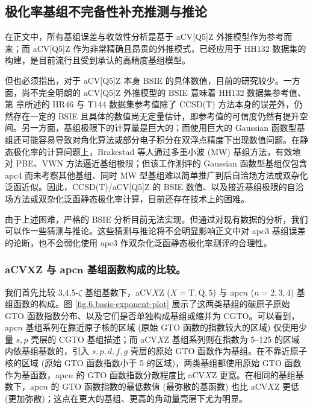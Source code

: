 \subsection{极化率基组不完备性补充推测与推论}
\label{sec.6.supp-bsie}

在正文中，所有基组误差与收敛性分析是基于 aCV[Q5]Z 外推模型作为参考而来；而 aCV[Q5]Z 作为非常精确且昂贵的外推模式，已经应用于 HH132 数据集的构建\cite{Hait-Head-Gordon.PCCP.2018}，是目前流行且受到承认的高精度基组模型。

但也必须指出，对于 aCV[Q5]Z 本身 BSIE 的具体数值，目前的研究较少。一方面，尚不完全明朗的 aCV[Q5]Z 外推模型的 BSIE 意味着 HH132 数据集参考值\cite{Hait-Head-Gordon.PCCP.2018}、第  章所述的 HR46 与 T144 数据集参考值除了 CCSD(T) 方法本身的误差外，仍然存在一定的 BSIE 且具体的数值尚无定量估计，即参考值的可信度仍然有提升空间。另一方面，基组极限下的计算量是巨大的；而使用巨大的 Gaussian 函数型基组还可能容易导致对角化算法或部分电子积分在双浮点精度下出现数值问题。在静态极化率的计算问题上，Brakestad 等人\cite{Brakestad-Frediani.JCTC.2020}通过多重小波 (MW) 基组方法，有效地对 PBE、VWN 方法逼近基组极限；但该工作测评的 Gaussian 函数型基组仅包含 apc4 而未考察其他基组、同时 MW 型基组难以简单推广到后自洽场方法或双杂化泛函近似。因此，CCSD(T)/aCV[Q5]Z 的 BSIE 数值、以及接近基组极限的自洽场方法或双杂化泛函静态极化率计算，目前还存在技术上的困难。

由于上述困难，严格的 BSIE 分析目前无法实现。但通过对现有数据的分析，我们可以作一些猜测与推论。这些猜测与推论将不会明显影响正文中对 apc3 基组误差的论断，也不会弱化使用 apc3 作双杂化泛函静态极化率测评的合理性。

\subsubsection{aCV$\bm{X}$Z 与 apc$\bm{n}$ 基组函数构成的比较。}

我们首先比较 3,4,5-$\zeta$ 基组基数下，aCV$X$Z ($X=\mathrm{T,Q,5}$) 与 apc$n$ ($n=2,3,4$) 基组函数的构成。图 \ref{fig.6.basis-exponent-plot} 展示了这两类基组的碳原子原始 GTO 函数指数分布、以及它们是否单独构成基组或缩并为 CGTO。可以看到，apc$n$ 基组系列在靠近原子核的区域 (原始 GTO 函数的指数较大的区域) 仅使用少量 $s, p$ 壳层的 CGTO 基组描述；而 aCV$X$Z 基组系列则在指数为 5--125 的区域内依基组基数的，引入 $s, p, d, f, g$ 壳层的原始 GTO 函数作为基组。在不靠近原子核的区域 (原始 GTO 函数指数小于 5 的区域)，两类基组都使用原始 GTO 函数作为基函数，apc$n$ 的 GTO 函数指数分散程度比 aCV$X$Z 更宽。在相同的基组基数下，apc$n$ 的 GTO 函数指数的最低数值 (最弥散的基函数) 也比 aCV$X$Z 更低 (更加弥散)；这点在更大的基组、更高的角动量壳层下尤为明显。

